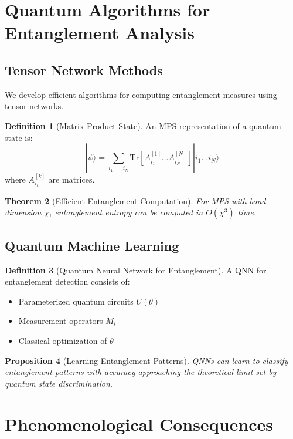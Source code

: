 \documentclass[12pt,a4paper]{article}
\newcommand{\Tr}{\mathrm{Tr}}
\theoremstyle{plain}
\newtheorem{theorem}{Theorem}[section]
\newtheorem{proposition}[theorem]{Proposition}
\theoremstyle{definition}
\newtheorem{definition}[theorem]{Definition}
\theoremstyle{remark}
\begin{document}
\section{Quantum Algorithms for Entanglement Analysis}

\subsection{Tensor Network Methods}

We develop efficient algorithms for computing entanglement measures using tensor networks.

\begin{definition}[Matrix Product State]
An MPS representation of a quantum state is:
\[|\psi\rangle = \sum_{i_1,...,i_N} \Tr[A^{[1]}_{i_1}...A^{[N]}_{i_N}]|i_1...i_N\rangle\]
where $A^{[k]}_{i_k}$ are matrices.
\end{definition}

\begin{theorem}[Efficient Entanglement Computation]
For MPS with bond dimension $\chi$, entanglement entropy can be computed in $O(\chi^3)$ time.
\end{theorem}

\subsection{Quantum Machine Learning}

\begin{definition}[Quantum Neural Network for Entanglement]
A QNN for entanglement detection consists of:
\begin{itemize}
\item Parameterized quantum circuits $U(\theta)$
\item Measurement operators $M_i$
\item Classical optimization of $\theta$
\end{itemize}
\end{definition}

\begin{proposition}[Learning Entanglement Patterns]
QNNs can learn to classify entanglement patterns with accuracy approaching the theoretical limit set by quantum state discrimination.
\end{proposition}

\section{Phenomenological Consequences}
\end{document}
